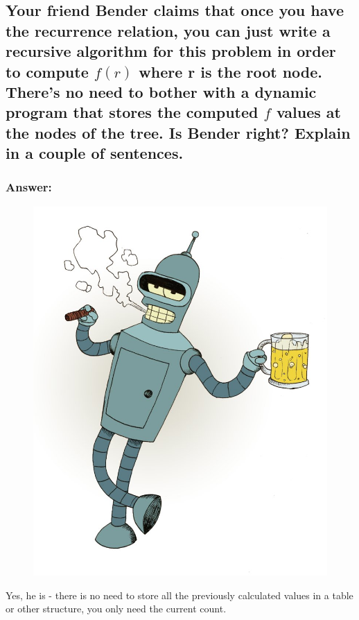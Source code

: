 \documentclass[titlepage]{article}
\theoremstyle{definition}
\begin{document}
  \subsection{Your friend Bender claims that once you have the recurrence
    relation, you can just write a recursive algorithm for this problem in
    order to compute $f(r)$ where r is the root node. There's no need to bother
    with a dynamic program that stores the computed $f$ values at the nodes of
    the tree. Is Bender right? Explain in a couple of sentences.}
      \subsubsection{Answer:}
        \begin{figure}
          \centering
            \includegraphics[scale=0.3]{bender}
        \end{figure}
        Yes, he is - there is no need to store all the previously calculated values in
        a table or other structure, you only need the current count. 
\end{document}
